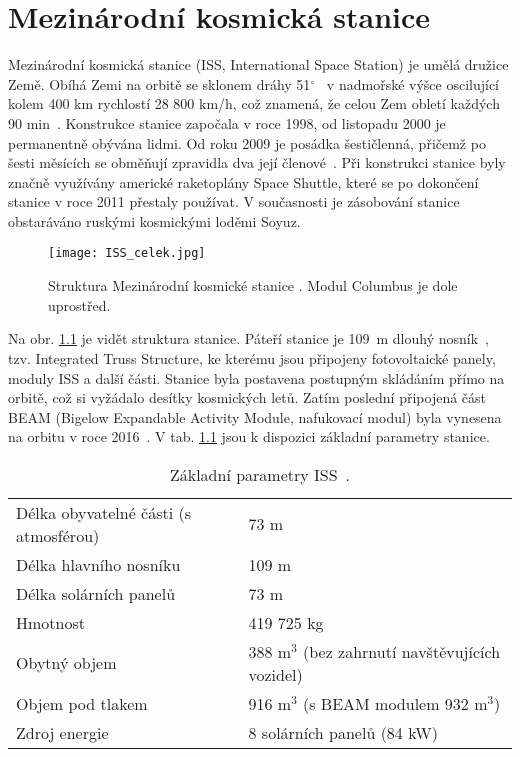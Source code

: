 %
\chapter{Mezinárodní kosmická stanice}
Mezinárodní kosmická stanice (ISS, International Space Station) je umělá družice Země. Obíhá Zemi na orbitě se sklonem dráhy 51$^{\circ}$~\cite{ISS_wiki} v nadmořské výšce oscilující kolem 400 km rychlostí 28 800 km/h, což znamená, že celou Zem obletí každých 90 min~\cite{ISS_where}. Konstrukce stanice započala v roce 1998, od listopadu 2000 je permanentně obývána lidmi. Od roku 2009 je posádka šestičlenná, přičemž po šesti měsících se obměňují zpravidla dva její členové~\cite{ISS_wiki}. Při konstrukci stanice byly značně využívány americké raketoplány Space Shuttle, které se po dokončení stanice v roce 2011 přestaly používat. V současnosti je zásobování stanice obstaráváno ruskými kosmickými loděmi Soyuz.
\begin{figure}[H]
  \centering
  \texttt{[image: ISS\_celek.jpg]}
  \caption{Struktura Mezinárodní kosmické stanice \cite{ISS_facts}. Modul Columbus je dole uprostřed.}
  \label{fig:ISS_celek}
\end{figure}

Na obr. \ref{fig:ISS_celek} je vidět struktura stanice. Páteří stanice je 109~m dlouhý nosník~\cite{ISS_facts}, tzv. Integrated Truss Structure, ke kterému jsou připojeny fotovoltaické panely, moduly ISS a další části. Stanice byla postavena postupným skládáním přímo na orbitě, což si vyžádalo desítky kosmických letů. Zatím poslední připojená část BEAM (Bigelow Expandable Activity Module, nafukovací modul) byla vynesena na orbitu v roce 2016~\cite{ISS_gifs}. V tab. \ref{tab:ISS_parametry} jsou k dispozici základní parametry stanice.
\begin{table}[h]
  \centering
  \caption{Základní parametry ISS~\cite{ISS_facts}.}
  \label{tab:ISS_parametry}
  \begin{tabular}{ll}
    \toprule
    Délka obyvatelné části (s atmosférou)&73 m\\
    Délka hlavního nosníku&109 m\\
    Délka solárních panelů&73 m\\
    Hmotnost&419 725 kg\\
    Obytný objem& 388 m$^3$ (bez zahrnutí navštěvujících vozidel)\\
    Objem pod tlakem&916 m$^3$ (s BEAM modulem 932 m$^3$)\\
    Zdroj energie& 8 solárních panelů (84 kW)\\
    \bottomrule
  \end{tabular}
\end{table}

